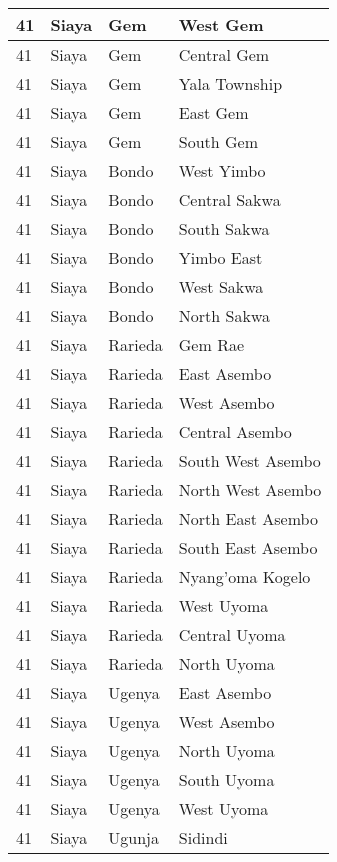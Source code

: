 \begin{table}[!ht]
\begin{tabular}{|l|l|l|l|}
        41 & Siaya & Gem & West Gem \\ \hline
        41 & Siaya & Gem & Central Gem \\ \hline
        41 & Siaya & Gem & Yala Township \\ \hline
        41 & Siaya & Gem & East Gem \\ \hline
        41 & Siaya & Gem & South Gem \\ \hline
        41 & Siaya & Bondo & West Yimbo \\ \hline
        41 & Siaya & Bondo & Central Sakwa \\ \hline
        41 & Siaya & Bondo & South Sakwa \\ \hline
        41 & Siaya & Bondo & Yimbo East \\ \hline
        41 & Siaya & Bondo & West Sakwa \\ \hline
        41 & Siaya & Bondo & North Sakwa \\ \hline
        41 & Siaya & Rarieda & Gem Rae \\ \hline
        41 & Siaya & Rarieda & East Asembo \\ \hline
        41 & Siaya & Rarieda & West Asembo \\ \hline
        41 & Siaya & Rarieda & Central Asembo \\ \hline
        41 & Siaya & Rarieda & South West Asembo \\ \hline
        41 & Siaya & Rarieda & North West Asembo \\ \hline
        41 & Siaya & Rarieda & North East Asembo \\ \hline
        41 & Siaya & Rarieda & South East Asembo \\ \hline
        41 & Siaya & Rarieda & Nyang’oma Kogelo \\ \hline
        41 & Siaya & Rarieda & West Uyoma \\ \hline
        41 & Siaya & Rarieda & Central Uyoma \\ \hline
        41 & Siaya & Rarieda & North Uyoma \\ \hline
        41 & Siaya & Ugenya & East Asembo \\ \hline
        41 & Siaya & Ugenya & West Asembo \\ \hline
        41 & Siaya & Ugenya & North Uyoma \\ \hline
        41 & Siaya & Ugenya & South Uyoma \\ \hline
        41 & Siaya & Ugenya & West Uyoma \\ \hline
        41 & Siaya & Ugunja & Sidindi \\ \hline

\end{tabular}
\end{table}
